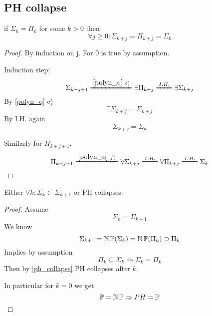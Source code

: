 


\subsection{PH collapse}

\begin{theorem}\label{ph_collapse}
	if $\Sigma_k = \Pi_k$ for some $k > 0$ then
	\[ \forall j \geq 0: \Sigma_{k + j} = \Pi_{k + j} = \Sigma_k \]
\end{theorem}
\begin{proof}
	By induction on j. For 0 is true by assumption.

	Induction step:
	\[ \Sigma_{k + j + 1} \xlongequal{\cref{polyn_q}\ c)} \exists \Pi_{k + j} \xlongequal{I.H.} \exists \Sigma_{k + j} \]
	By \cref{polyn_q} c)
	\[ \exists \Sigma_{k + j} = \Sigma_{k + j} \]
	By I.H. again
	\[ \Sigma_{k + j} = \Sigma_k \]

	Similarly for $\Pi_{k + j + 1}$.
	\[ \Pi_{k + j + 1} \xlongequal{\cref{polyn_q}\ f)} \forall \Sigma_{k + j} \xlongequal{I.H.} \forall \Pi_{k + j} \xlongequal{I.H.} \Sigma_k \]
\end{proof}

\begin{theorem}
	Either $\forall k: \Sigma_k \subset \Sigma_{k + 1}$ or PH collapses.
\end{theorem}
\begin{proof}
	Assume
	\[ \Sigma_k = \Sigma_{k + 1} \]
	We know
	\[ \Sigma_{k + 1} = \operatorname{\operatorname{\mathbb{N}}\mathbb{P}}(\Sigma_{k}) = \operatorname{\operatorname{\mathbb{N}}\mathbb{P}}(\Pi_k) \supset \Pi_k \]
	Implies by assumption
	\[ \Pi_k \subseteq \Sigma_k \Rightarrow \Sigma_k = \Pi_k \]
	Then by \cref{ph_collapse} PH collapses after $k$.

	In particular for $k = 0$ we get
	\[ \operatorname{\mathbb{P}} = \operatorname{\operatorname{\mathbb{N}}\mathbb{P}} \Rightarrow PH = \operatorname{\mathbb{P}} \]
\end{proof}

